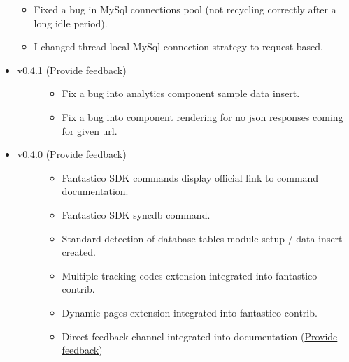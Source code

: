 \documentclass[letterpaper,10pt,english]{sphinxmanual}
\begin{document}
\begin{itemize}
\begin{itemize}
\item {} 
Fixed a bug in MySql connections pool (not recycling correctly after a long idle period).

\item {} 
I changed thread local MySql connection strategy to request based.

\end{itemize}

\item {} \begin{description}
\item[{v0.4.1 (\href{https://docs.google.com/forms/d/1tKBopU3lfDB\_w8F4h7Rl1Rn4uydAJq-nha09L\_ptJck/edit?usp=sharing}{Provide feedback})}] \leavevmode\begin{itemize}
\item {} 
Fix a bug into analytics component sample data insert.

\item {} 
Fix a bug into component rendering for no json responses coming for given url.

\end{itemize}

\end{description}

\item {} \begin{description}
\item[{v0.4.0 (\href{https://docs.google.com/forms/d/1tKBopU3lfDB\_w8F4h7Rl1Rn4uydAJq-nha09L\_ptJck/edit?usp=sharing}{Provide feedback})}] \leavevmode\begin{itemize}
\item {} 
Fantastico SDK commands display official link to command documentation.

\item {} 
Fantastico SDK syncdb command.

\item {} 
Standard detection of database tables module setup / data insert created.

\item {} 
Multiple tracking codes extension integrated into fantastico contrib.

\item {} 
Dynamic pages extension integrated into fantastico contrib.

\item {} 
Direct feedback channel integrated into documentation (\href{https://docs.google.com/forms/d/1tKBopU3lfDB\_w8F4h7Rl1Rn4uydAJq-nha09L\_ptJck/edit?usp=sharing}{Provide feedback})


\end{itemize}
\end{description}
\end{itemize}
\end{document}
